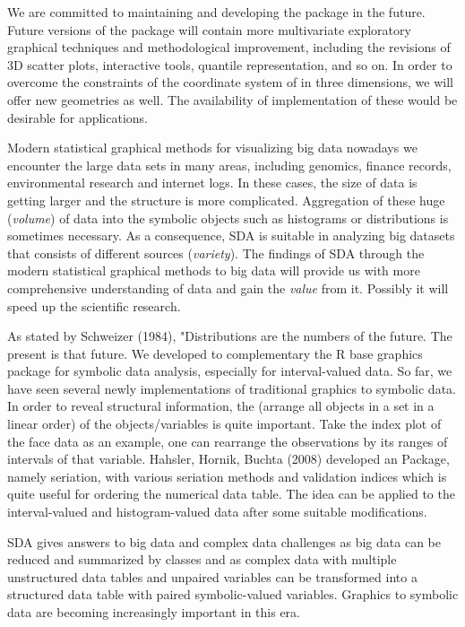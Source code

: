 \documentclass[article]{jss}
\begin{document}
We are committed to maintaining and developing the 
package in the future. Future versions of the package will contain
more multivariate exploratory graphical techniques and methodological
improvement, including the revisions of 3D scatter plots, interactive
tools, quantile representation, and so on. In order to overcome the
constraints of the coordinate system of  in three
dimensions, we will offer new geometries as well. The availability of
implementation of these would be desirable for applications.


Modern statistical graphical methods for visualizing big data nowadays
we encounter the large data sets in many areas, including genomics,
finance records, environmental research and internet logs. In these
cases, the size of data is getting larger and the structure is more
complicated. Aggregation of these huge ({\it volume}) of data into the
symbolic objects such as histograms or distributions is sometimes
necessary. As a consequence, SDA is suitable in analyzing big datasets
that consists of different sources ({\it variety}). The findings of
SDA through the modern statistical graphical methods to big data will
provide us with more comprehensive understanding of data and gain the
{\it value} from it. Possibly it will speed up the scientific
research.

As stated by Schweizer (1984), "Distributions are the numbers of the
future. The present is that future. We developed  to
complementary the R base graphics package for symbolic data analysis,
especially for interval-valued data. So far, we have seen several
newly implementations of traditional graphics to symbolic data. In
order to reveal structural information, the  (arrange
all objects in a set in a linear order) of the objects/variables is
quite important. Take the index plot of the face data as an example,
one can rearrange the observations by its ranges of intervals of that
variable. Hahsler, Hornik, Buchta (2008) developed an 
Package, namely {\sf seriation}, with various seriation methods and
validation indices which is quite useful for ordering the numerical
data table. The idea can be applied to the interval-valued and
histogram-valued data after some suitable modifications.

SDA gives answers to big data and complex data challenges as big data
can be reduced and summarized by classes and as complex data with
multiple unstructured data tables and unpaired variables can be
transformed into a structured data table with paired symbolic-valued
variables. Graphics to symbolic data are becoming increasingly
important in this era.
\end{document}
